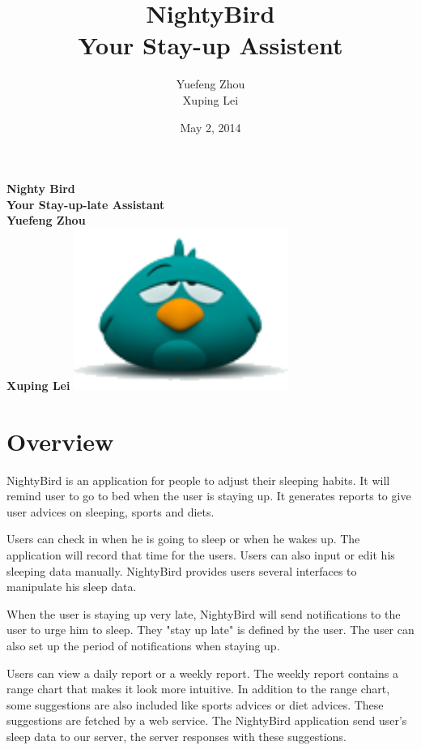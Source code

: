 \documentclass[14pt]{extreport}
\begin{document}
\title{NightyBird\\Your Stay-up Assistent}
\doublespacing

\author{Yuefeng Zhou\\Xuping Lei}
\date{May 2, 2014}

\begin{titlepage}
    \centering
    \vfill
    {\bfseries\Large
        Nighty Bird\\
        Your Stay-up-late Assistant\\
        \vskip2cm
        Yuefeng Zhou\\
        Xuping Lei
    }    
    \vfill
    \includegraphics[width=7cm]{icon.png} %
    \vfill
    \vfill
\end{titlepage}

\tableofcontents

\chapter{Overview}
NightyBird is an application for people to adjust their sleeping habits. It will remind user to go to bed when the user is staying up. It generates reports to give user advices on sleeping, sports and diets.

Users can check in when he is going to sleep or when he wakes up. The application will record that time for the users. Users can also input or edit his sleeping data manually. NightyBird provides users several interfaces to manipulate his sleep data. 

When the user is staying up very late, NightyBird will send notifications to the user to urge him to sleep. They "stay up late" is defined by the user. The user can also set up the period of notifications when staying up.

Users can view a daily report or a weekly report. The weekly report contains a range chart that makes it look more intuitive. In addition to the range chart, some suggestions are also included like sports advices or diet advices. These suggestions are fetched by a web service. The NightyBird application send user's sleep data to our server, the server responses with these suggestions.
\end{document}
